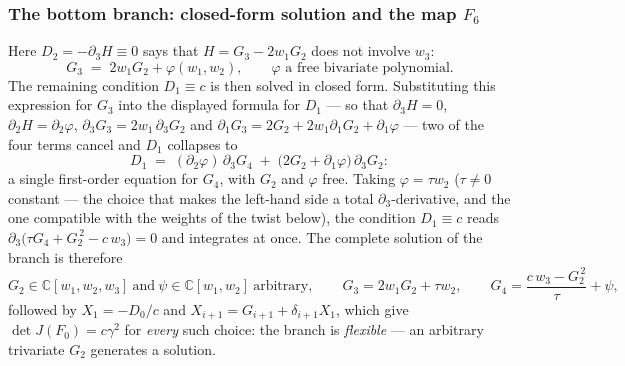 \documentclass[11pt]{article}
\theoremstyle{plain}
\theoremstyle{definition}
\theoremstyle{remark}
\newcommand{\C}{\mathbb{C}}
\begin{document}
\subsubsection{The bottom branch: closed-form solution and the map $F_6$}
\label{subsubsec:bottom5}

Here $D_2=-\partial_3H\equiv0$ says that $H=G_3-2w_1G_2$ does not involve
$w_3$:
\[
G_3\;=\;2w_1G_2+\varphi(w_1,w_2),
\qquad\text{$\varphi$ a free bivariate polynomial.}
\]
The remaining condition $D_1\equiv c$ is then solved in closed form.
Substituting this expression for $G_3$ into the displayed formula for $D_1$
--- so that $\partial_3H=0$, $\partial_2H=\partial_2\varphi$,
$\partial_3G_3=2w_1\,\partial_3G_2$ and
$\partial_1G_3=2G_2+2w_1\partial_1G_2+\partial_1\varphi$ --- two of the four
terms cancel and $D_1$ collapses to
\[
D_1\;=\;(\partial_2\varphi)\,\partial_3G_4
\;+\;\bigl(2G_2+\partial_1\varphi\bigr)\,\partial_3G_2 :
\]
a single first-order equation for $G_4$, with $G_2$ and $\varphi$ free. Taking
$\varphi=\tau w_2$ ($\tau\neq0$ constant --- the choice that makes the
left-hand side a total $\partial_3$-derivative, and the one compatible with
the weights of the twist below), the condition $D_1\equiv c$ reads
$\partial_3\bigl(\tau G_4+G_2^{\,2}-c\,w_3\bigr)=0$ and integrates at once.
The complete solution of the branch is therefore
\[
G_2\in\C[w_1,w_2,w_3]\ \text{and}\ \psi\in\C[w_1,w_2]\ \text{arbitrary},\qquad
G_3=2w_1G_2+\tau w_2,\qquad
G_4=\frac{c\,w_3-G_2^{\,2}}{\tau}+\psi ,
\]
followed by $X_1=-D_0/c$ and $X_{i+1}=G_{i+1}+\delta_{i+1}X_1$, which give
$\det J(F_0)=c\gamma^2$ for \emph{every} such choice: the branch is
\emph{flexible} --- an arbitrary trivariate $G_2$ generates a solution.
\end{document}
